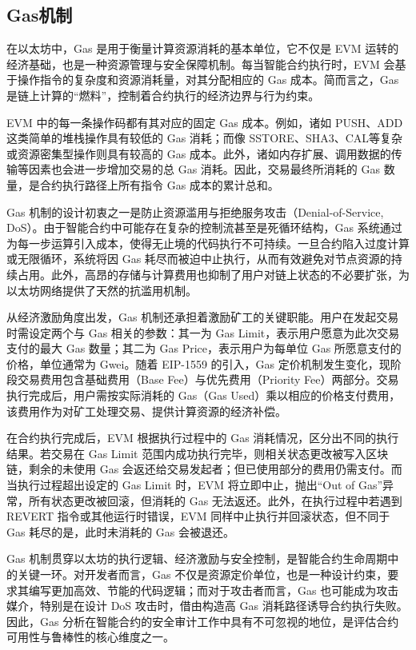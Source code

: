 \documentclass[print, master, vlined, timesmath]{DissertUESTC}
\begin{document}
\subsection{Gas机制}

在以太坊中，Gas 是用于衡量计算资源消耗的基本单位\cite{}，它不仅是 EVM 运转的经济基础，也是一种资源管理与安全保障机制。每当智能合约执行时，EVM 会基于操作指令的复杂度和资源消耗量，对其分配相应的 Gas 成本\cite{}。简而言之，Gas 是链上计算的“燃料”，控制着合约执行的经济边界与行为约束。

EVM 中的每一条操作码都有其对应的固定 Gas 成本\cite{}。例如，诸如 PUSH、ADD 这类简单的堆栈操作具有较低的 Gas 消耗；而像 SSTORE、SHA3、CAL等复杂或资源密集型操作则具有较高的 Gas 成本。此外，诸如内存扩展、调用数据的传输等因素也会进一步增加交易的总 Gas 消耗。因此，交易最终所消耗的 Gas 数量，是合约执行路径上所有指令 Gas 成本的累计总和。

Gas 机制的设计初衷之一是防止资源滥用与拒绝服务攻击（Denial-of-Service, DoS）\cite{}。由于智能合约中可能存在复杂的控制流甚至是死循环结构，Gas 系统通过为每一步运算引入成本，使得无止境的代码执行不可持续。一旦合约陷入过度计算或无限循环，系统将因 Gas 耗尽而被迫中止执行，从而有效避免对节点资源的持续占用。此外，高昂的存储与计算费用也抑制了用户对链上状态的不必要扩张，为以太坊网络提供了天然的抗滥用机制。

从经济激励角度出发，Gas 机制还承担着激励矿工的关键职能\cite{}。用户在发起交易时需设定两个与 Gas 相关的参数：其一为 Gas Limit，表示用户愿意为此次交易支付的最大 Gas 数量；其二为 Gas Price，表示用户为每单位 Gas 所愿意支付的价格，单位通常为 Gwei。随着 EIP-1559 的引入\cite{}，Gas 定价机制发生变化，现阶段交易费用包含基础费用（Base Fee）与优先费用（Priority Fee）两部分。交易执行完成后，用户需按实际消耗的 Gas（Gas Used）乘以相应的价格支付费用，该费用作为对矿工处理交易、提供计算资源的经济补偿。

在合约执行完成后，EVM 根据执行过程中的 Gas 消耗情况，区分出不同的执行结果。若交易在 Gas Limit 范围内成功执行完毕，则相关状态更改被写入区块链，剩余的未使用 Gas 会返还给交易发起者；但已使用部分的费用仍需支付。而当执行过程超出设定的 Gas Limit 时，EVM 将立即中止，抛出“Out of Gas”异常，所有状态更改被回滚，但消耗的 Gas 无法返还。此外，在执行过程中若遇到 REVERT 指令或其他运行时错误，EVM 同样中止执行并回滚状态，但不同于 Gas 耗尽的是，此时未消耗的 Gas 会被退还。

Gas 机制贯穿以太坊的执行逻辑、经济激励与安全控制，是智能合约生命周期中的关键一环。对开发者而言，Gas 不仅是资源定价单位，也是一种设计约束，要求其编写更加高效、节能的代码逻辑；而对于攻击者而言，Gas 也可能成为攻击媒介，特别是在设计 DoS 攻击时，借由构造高 Gas 消耗路径诱导合约执行失败\cite{}。因此，Gas 分析在智能合约的安全审计工作中具有不可忽视的地位，是评估合约可用性与鲁棒性的核心维度之一。
\end{document}
